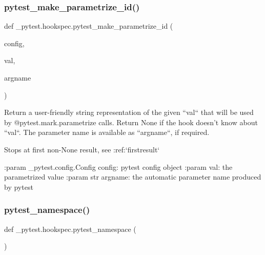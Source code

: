 \subsubsection{\texorpdfstring{pytest\+\_\+make\+\_\+parametrize\+\_\+id()}{pytest\_make\_parametrize\_id()}}
{\footnotesize\ttfamily def \+\_\+pytest.\+hookspec.\+pytest\+\_\+make\+\_\+parametrize\+\_\+id (\begin{DoxyParamCaption}\item[{}]{config,  }\item[{}]{val,  }\item[{}]{argname }\end{DoxyParamCaption})}

\begin{DoxyVerb}Return a user-friendly string representation of the given ``val`` that will be used
by @pytest.mark.parametrize calls. Return None if the hook doesn't know about ``val``.
The parameter name is available as ``argname``, if required.

Stops at first non-None result, see :ref:`firstresult`

:param _pytest.config.Config config: pytest config object
:param val: the parametrized value
:param str argname: the automatic parameter name produced by pytest
\end{DoxyVerb}
 \mbox{\label{namespace__pytest_1_1hookspec_ac04deee1cfa4678115b96ae2fa581458}} 
\subsubsection{\texorpdfstring{pytest\+\_\+namespace()}{pytest\_namespace()}}
{\footnotesize\ttfamily def \+\_\+pytest.\+hookspec.\+pytest\+\_\+namespace (\begin{DoxyParamCaption}{ }\end{DoxyParamCaption})}

